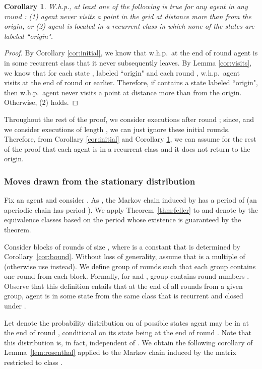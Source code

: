 \documentclass[11pt]{article}
\newtheorem{corollary}[theorem]{Corollary}
\begin{document}
\begin{corollary}
\label{cor:origin}
W.h.p., at least one of the following is true for any agent  in any round : (1) agent  never visits a point in the grid at distance more than  from the origin, or (2) agent  is located in a recurrent class in which none of the states are labeled ``origin".
\end{corollary}
\begin{proof}
	By Corollary \ref{cor:initial}, we know that w.h.p.\ at the end of round  agent  is in some recurrent class  that it never subsequently leaves. By Lemma \ref{cor:visits}, we know that for each state , labeled ``origin" and each round , w.h.p.\ agent  visits  at the end of round  or earlier. Therefore, if  contains a state labeled ``origin", then w.h.p.\ agent  never visits a point at distance more than  from the origin. Otherwise, (2) holds.
\end{proof}

Throughout the rest of the proof, we consider executions after round ; since,  and we consider executions of length , we can just ignore these initial rounds. Therefore, from Corollary \ref{cor:initial} and Corollary \ref{cor:origin}, we can assume for the rest of the proof that each agent  is in a recurrent class  and it does not return to the origin.


\subsubsection{Moves drawn from the stationary distribution}
\label{sec:draw}

Fix an agent  and consider . As , the Markov chain induced by  has a period of  (an aperiodic chain has period ). We apply Theorem~\ref{thm:feller} to  and denote by  the equivalence classes based on the period  whose existence is guaranteed by the theorem.

Consider blocks of rounds of size , where  is a constant that is determined by Corollary~\ref{cor:bound}. Without loss of generality, assume that  is a multiple of  (otherwise use  instead). We define group of rounds such that each group contains one round from each block. Formally, for  and , group  contains round numbers . Observe that this definition entails that at the end of all rounds from a given group, agent  is in some state from the same class  that is recurrent and closed under .

Let  denote the probability distribution on  of possible states agent  may be in at the end of round , conditional on its state being  at the end of round . Note that this distribution is, in fact, independent of . We obtain the following corollary of Lemma~\ref{lem:rosenthal} applied to the Markov chain induced by the matrix  restricted to class .
\end{document}
